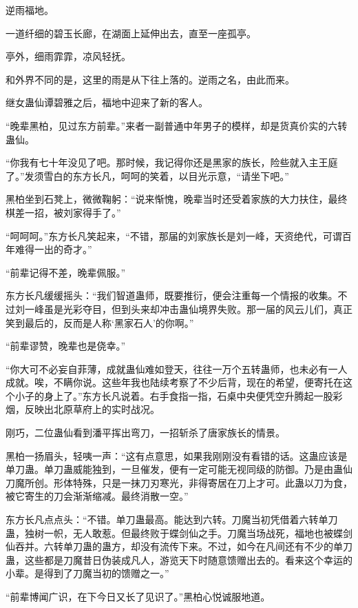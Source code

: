 
\begin{this_body}

逆雨福地。

一道纤细的碧玉长廊，在湖面上延伸出去，直至一座孤亭。

亭外，细雨霏霏，凉风轻抚。

和外界不同的是，这里的雨是从下往上落的。逆雨之名，由此而来。

继女蛊仙谭碧雅之后，福地中迎来了新的客人。

“晚辈黑柏，见过东方前辈。”来者一副普通中年男子的模样，却是货真价实的六转蛊仙。

“你我有七十年没见了吧。那时候，我记得你还是黑家的族长，险些就入主王庭了。”发须雪白的东方长凡，呵呵的笑着，以目光示意，“请坐下吧。”

黑柏坐到石凳上，微微鞠躬：“说来惭愧，晚辈当时还受着家族的大力扶住，最终棋差一招，被刘家得手了。”

“呵呵呵。”东方长凡笑起来，“不错，那届的刘家族长是刘一峰，天资绝代，可谓百年难得一出的奇才。”

“前辈记得不差，晚辈佩服。”

东方长凡缓缓摇头：“我们智道蛊师，既要推衍，便会注重每一个情报的收集。不过刘一峰虽是光彩夺目，但到头来却冲击蛊仙境界失败。那一届的风云儿们，真正笑到最后的，反而是人称‘黑家石人’的你啊。”

“前辈谬赞，晚辈也是侥幸。”

“你大可不必妄自菲薄，成就蛊仙难如登天，往往一万个五转蛊师，也未必有一人成就。唉，不瞒你说。这些年我也陆续考察了不少后背，现在的希望，便寄托在这个小子的身上了。”东方长凡说着。右手食指一指，石桌中央便凭空升腾起一股彩烟，反映出北原草府上的实时战况。

刚巧，二位蛊仙看到潘平挥出弯刀，一招斩杀了唐家族长的情景。

黑柏一扬眉头，轻咦一声：“这有点意思，如果我刚刚没有看错的话。这蛊应该是单刀蛊。单刀蛊威能独到，一旦催发，便有一定可能无视同级的防御。乃是由蛊仙刀魔所创。形体特殊，只是一抹刀刃寒光，非得寄居在刀上才可。此蛊以刀为食，被它寄生的刀会渐渐缩减。最终消散一空。”

东方长凡点点头：“不错。单刀蛊最高。能达到六转。刀魔当初凭借着六转单刀蛊，独树一帜，无人敢惹。但最终败于蝶剑仙之手。刀魔当场战死，福地也被蝶剑仙吞并。六转单刀蛊的蛊方，却没有流传下来。不过，如今在凡间还有不少的单刀蛊，这些都是刀魔昔日伪装成凡人，游览天下时随意馈赠出去的。看来这个幸运的小辈。是得到了刀魔当初的馈赠之一。”

“前辈博闻广识，在下今日又长了见识了。”黑柏心悦诚服地道。


\end{this_body}
